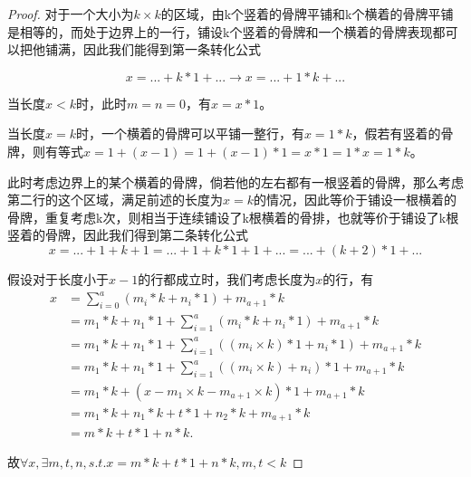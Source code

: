 \begin{proof}

    对于一个大小为$k \times k$的区域，由k个竖着的骨牌平铺和k个横着的骨牌平铺是相等的，而处于边界上的一行，铺设k个竖着的骨牌和一个横着的骨牌表现都可以把他铺满，因此我们能得到第一条转化公式

    \begin{equation}
        x =... + k * 1 + ... \rightarrow x = ... + 1 * k + ...
    \end{equation}

    当长度$x < k$时，此时$m = n = 0$，有$x = x * 1$。

    当长度$x = k$时，一个横着的骨牌可以平铺一整行，有$x = 1 * k$，假若有竖着的骨牌，则有等式$x = 1 + (x - 1) = 1 + (x - 1) * 1 = x * 1 = 1 * x = 1 * k$。

    此时考虑边界上的某个横着的骨牌，倘若他的左右都有一根竖着的骨牌，那么考虑第二行的这个区域，满足前述的长度为$x = k$的情况，因此等价于铺设一根横着的骨牌，重复考虑k次，则相当于连续铺设了k根横着的骨排，也就等价于铺设了k根竖着的骨牌，因此我们得到第二条转化公式
    \begin{equation}
        x = ... + 1 + k + 1 = ... + 1 + k * 1 + 1 + ...= ... + (k + 2) * 1 + ...
    \end{equation}

    假设对于长度小于$x-1$的行都成立时，我们考虑长度为$x$的行，有
    $$
        \begin{aligned}
            x & = \sum_{i=0}^{a} (m_i * k + n_i * 1) + m_{a+1} * k                                \\
              & = m_1 * k + n_1 * 1 + \sum_{i=1}^{a} (m_i * k + n_i * 1)+ m_{a+1} * k             \\
              & = m_1 * k + n_1 * 1 + \sum_{i=1}^{a} ((m_i \times k) * 1 + n_i * 1) + m_{a+1} * k \\
              & = m_1 * k + n_1 * 1 + \sum_{i=1}^{a} ((m_i \times k) + n_i) * 1 + m_{a+1} * k     \\
              & = m_1 * k + (x - m_1 \times k - m_{a+1} \times k) * 1 + m_{a+1} * k               \\
              & = m_1 * k + n_1 * k + t * 1 + n_2 * k + m_{a+1} * k                               \\
              & = m * k + t * 1 + n * k.
        \end{aligned}
    $$

    故$\forall x, \exists m, t, n, s.t. x = m * k + t * 1 + n * k, m, t < k$
\end{proof}

